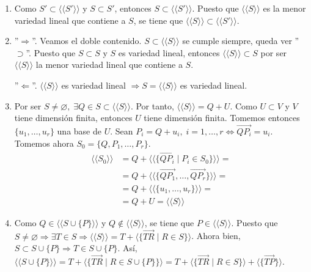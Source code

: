 \documentclass[12pt, a4paper, ones, notitlepage, openany,titlepage]{article}
\begin{document}
\begin{enumerate}[label=(\alph*)]
	\item Como $S' \subset \langle\langle S' \rangle\rangle$ y $S \subset S'$, entonces $S \subset \langle\langle S' \rangle\rangle$. Puesto que $\langle\langle S \rangle\rangle$ es la menor variedad lineal que contiene a $S$, se tiene que $\langle\langle S \rangle\rangle \subset \langle\langle S' \rangle\rangle$.
	\item ''$\Longrightarrow$''. Veamos el doble contenido. $S \subset \langle\langle S \rangle\rangle$ se cumple siempre, queda ver ''$\supset$''. Puesto que $S \subset S$ y $S$ es variedad lineal, entonces $\langle\langle S \rangle\rangle \subset S$ por ser $\langle\langle S \rangle\rangle$ la menor variedad lineal que contiene a $S$.
	
	''$\Longleftarrow$''. $\langle\langle S \rangle\rangle$ es variedad lineal $\Longrightarrow S = \langle\langle S \rangle\rangle$ es variedad lineal.
	\item Por ser $S \neq \varnothing, \; \exists Q \in S \subset \langle\langle S \rangle\rangle$. Por tanto, $\langle\langle S \rangle\rangle = Q + U$. Como $U \subset V$ y $V$ tiene dimensión finita, entonces $U$ tiene dimensión finita. Tomemos entonces $\{u_1,\ldots,u_r\}$ una base de $U$. Sean $P_i = Q + u_i, \; i = 1,\ldots,r \Longleftrightarrow \overrightarrow{QP_i} = u_i$. Tomemos ahora $S_0 = \{Q, P_1, \ldots, P_r\}$.
	$$
	\begin{aligned}
		\langle\langle S_0 \rangle\rangle & = Q + \langle\langle \{\overrightarrow{QP_i} \mid P_i \in S_0\} \rangle\rangle = \\ & = Q + \langle\langle \{\overrightarrow{QP_1},\ldots,\overrightarrow{QP_r}\} \rangle\rangle = \\ & = Q + \langle\langle \{u_1,\ldots,u_r\} \rangle\rangle = \\ & = Q + U = \langle\langle S \rangle\rangle
	\end{aligned}
	$$
	\item Como $Q \in \langle\langle S \cup \{P\} \rangle\rangle$ y $Q \notin \langle\langle S \rangle\rangle$, se tiene que $P \in \langle\langle S \rangle\rangle$. Puesto que $S \neq \varnothing \Longrightarrow \exists T \in S \Longrightarrow \langle\langle S \rangle\rangle = T + \langle \{\overrightarrow{TR} \mid R \in S\} \rangle$. Ahora bien, $S \subset S \cup \{P\} \Longrightarrow T \in S \cup \{P\}$. Así, $\langle\langle S \cup \{P\} \rangle\rangle = T + \langle \{\overrightarrow{TR} \mid R \in S \cup \{P\}\} \rangle = T + \langle \{\overrightarrow{TR} \mid R \in S\} \rangle + \langle \{\overrightarrow{TP}\} \rangle$.
	

\end{enumerate}
\end{document}
